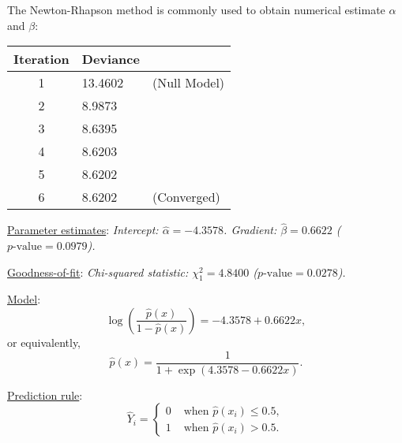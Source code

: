 The Newton-Rhapson method is commonly used to obtain numerical estimate $\alpha$ and $\beta$:
\begin{center}
\begin{tabular}{|c|ll|} \hline
Iteration	& Deviance & \\ \hline
1 	& 13.4602 & (Null Model) \\
2 	& 8.9873 & \\
3	& 8.6395 & \\
4	& 8.6203 & \\
5	& 8.6202 & \\
6	& 8.6202 & (Converged) \\ \hline
\end{tabular}
\end{center}



\underline{Parameter estimates}:
\bit
\it Intercept: $\hat{\alpha} = -4.3578$.
\it Gradient: $\hat{\beta} = 0.6622$ ($p\text{-value}=0.0979$).
\eit

\vspace*{2ex}
\underline{Goodness-of-fit}:
\bit
\it Chi-squared statistic: $\chi^2_1 = 4.8400$ ($p\text{-value}=0.0278$).
\eit

\vspace*{2ex}
\underline{Model}:
\[
\log\left(\frac{\hat{p}(x)}{1-\hat{p}(x)}\right) = -4.3578 + 0.6622 x,
\]
or equivalently,
\[
\hat{p}(x) = \frac{1}{1+\exp(4.3578 - 0.6622 x)}.
\]

\vspace*{2ex}
\underline{Prediction rule}:
\[
\hat{Y}_i = \left\{\begin{array}{ll}
	0	& \text{ when $\hat{p}(x_i)\leq 0.5$}, \\
	1	& \text{ when $\hat{p}(x_i)>0.5$}.
\end{array}\right.
\]

\vspace*{2ex}

